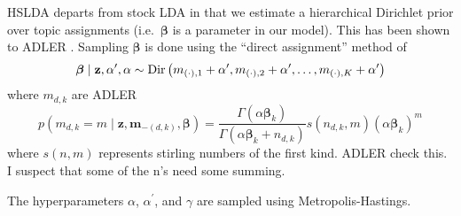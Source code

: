 %
%
%

HSLDA departs from stock LDA in that we estimate a hierarchical Dirichlet prior over topic assignments (i.e.~$\boldsymbol\beta$ is a parameter in our model).  This has been shown to ADLER \citep{WallachMiMc2009}. 
%
Sampling $\boldsymbol\beta$ is done using the ``direct assignment''
method of \citet{TehJorBea2006} \begin{equation}
\boldsymbol\beta\mid\mathbf{z},\alpha^{\prime},\alpha\sim{\rm Dir}\left(m_{\left(\cdot\right),1}+\alpha^{\prime},m_{\left(\cdot\right),2}+\alpha^{\prime},\ldots,m_{\left(\cdot\right),K}+\alpha^{\prime}\right)\end{equation}
where $m_{d,k}$ are ADLER
 \begin{equation}
p\left(m_{d,k}=m\mid\mathbf{z},\mathbf{m}_{-\left(d,k\right)},\boldsymbol\beta\right)=\frac{\Gamma\left(\alpha\boldsymbol\beta_{k}\right)}{\Gamma\left(\alpha\boldsymbol\beta_{k}+n_{d,k}\right)}s\left(n_{d,k},m\right)\left(\alpha\boldsymbol\beta_{k}\right)^{m}\end{equation}
 where $s\left(n,m\right)$ represents stirling numbers of the first
kind.  ADLER check this.  I suspect that some of the n's need some summing.



The hyperparameters $\alpha$, $\alpha^{\prime}$, and $\gamma$ are
sampled
using Metropolis-Hastings. 

